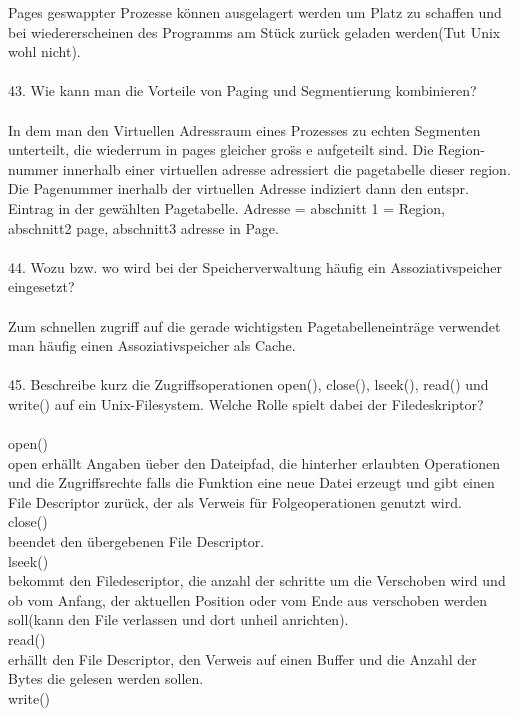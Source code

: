 \documentclass{article}
\newcommand\tab[1][1cm]{\hspace*{#1}}
\begin{document}
Pages geswappter Prozesse k\"onnen ausgelagert werden um Platz zu schaffen und bei wiedererscheinen des Programms am St\"uck zur\"uck geladen werden(Tut Unix wohl nicht).
\\
\\
43. Wie kann man die Vorteile von Paging und Segmentierung kombinieren?
\\
\\
In dem man den Virtuellen Adressraum  eines Prozesses zu echten Segmenten unterteilt, die wiederrum in pages gleicher gro\"ss e aufgeteilt sind. Die Region-nummer innerhalb einer virtuellen adresse adressiert die pagetabelle dieser region. Die Pagenummer inerhalb der virtuellen Adresse indiziert dann den entspr. Eintrag in der gew\"ahlten Pagetabelle.
Adresse = abschnitt 1 = Region, abschnitt2 page, abschnitt3 adresse in Page.
\\
\\
44. Wozu bzw. wo wird bei der Speicherverwaltung häufig ein Assoziativspeicher eingesetzt?
\\
\\
Zum schnellen zugriff auf die gerade wichtigsten Pagetabelleneintr\"age verwendet man h\"aufig einen Assoziativspeicher als Cache. 
\\
\\
45. Beschreibe kurz die Zugriffsoperationen open(), close(), lseek(), read() und write()
auf ein Unix-Filesystem. Welche Rolle spielt dabei der Filedeskriptor?
\\
\\
open()\\
\tab open erh\"allt Angaben \"ueber den Dateipfad, die hinterher erlaubten Operationen und die Zugriffsrechte falls die Funktion eine neue Datei erzeugt und gibt einen File Descriptor zur\"uck, der als Verweis f\"ur Folgeoperationen genutzt wird.\\
close()\\
\tab beendet den \"ubergebenen File Descriptor.\\
lseek()\\
\tab bekommt den Filedescriptor, die anzahl der schritte um die Verschoben wird und ob vom Anfang, der aktuellen Position oder vom Ende aus verschoben werden soll(kann den File verlassen und dort unheil anrichten).\\
read()\\
\tab erh\"allt den File Descriptor, den Verweis auf einen Buffer und die Anzahl der Bytes die gelesen werden sollen.\\
write()\\
\end{document}
